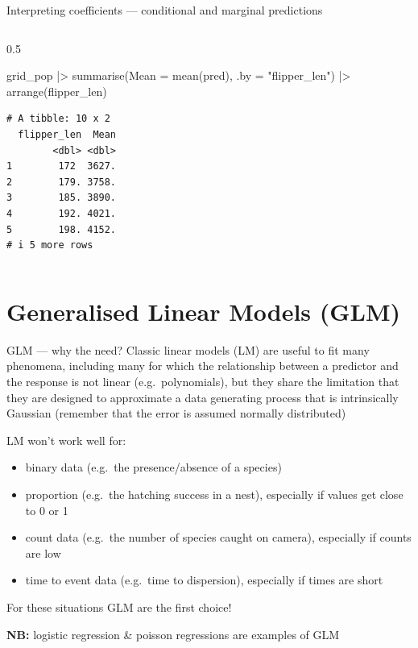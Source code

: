 \documentclass[
  10pt,
  ignorenonframetext,
  aspectratio=169,
  t]{beamer}
\newenvironment{Shaded}{\begin{snugshade}}{\end{snugshade}}
\newcommand{\AttributeTok}[1]{\textcolor[rgb]{0.40,0.45,0.13}{#1}}
\newcommand{\FunctionTok}[1]{\textcolor[rgb]{0.28,0.35,0.67}{#1}}
\newcommand{\NormalTok}[1]{\textcolor[rgb]{0.00,0.23,0.31}{#1}}
\newcommand{\SpecialCharTok}[1]{\textcolor[rgb]{0.37,0.37,0.37}{#1}}
\newcommand{\StringTok}[1]{\textcolor[rgb]{0.13,0.47,0.30}{#1}}
\providecommand{\tightlist}{%
  \setlength{\itemsep}{0pt}\setlength{\parskip}{0pt}}
\begin{document}
\begin{frame}[fragile]{Interpreting coefficients --- conditional and
marginal predictions}
\begin{columns}[T]
\begin{column}{0.5\linewidth}
\begin{Shaded}
\begin{Highlighting}[]
\NormalTok{grid\_pop }\SpecialCharTok{|\textgreater{}} 
  \FunctionTok{summarise}\NormalTok{(}\AttributeTok{Mean =} \FunctionTok{mean}\NormalTok{(pred), }\AttributeTok{.by =} \StringTok{"flipper\_len"}\NormalTok{) }\SpecialCharTok{|\textgreater{}} 
  \FunctionTok{arrange}\NormalTok{(flipper\_len)}
\end{Highlighting}
\end{Shaded}

\begin{verbatim}
# A tibble: 10 x 2
  flipper_len  Mean
        <dbl> <dbl>
1        172  3627.
2        179. 3758.
3        185. 3890.
4        192. 4021.
5        198. 4152.
# i 5 more rows
\end{verbatim}

\normalsize
\end{column}
\end{columns}
\end{frame}

\section{Generalised Linear Models
(GLM)}\label{generalised-linear-models-glm}

\begin{frame}{GLM --- why the need?}
\protect{}\label{glm-why-the-need}
Classic linear models (LM) are useful to fit many phenomena, including
many for which the relationship between a predictor and the response is
not linear (e.g.~polynomials), but they share the limitation that they
are designed to approximate a data generating process that is
intrinsically Gaussian (remember that the error is assumed normally
distributed)

LM won't work well for:

\begin{itemize}
\tightlist
\item
  binary data (e.g.~the presence/absence of a species)
\item
  proportion (e.g.~the hatching success in a nest), especially if values
  get close to 0 or 1
\item
  count data (e.g.~the number of species caught on camera), especially
  if counts are low
\item
  time to event data (e.g.~time to dispersion), especially if times are
  short
\end{itemize}

For these situations GLM are the first choice!

\textbf{NB:} logistic regression \& poisson regressions are examples of
GLM
\end{frame}
\end{document}

